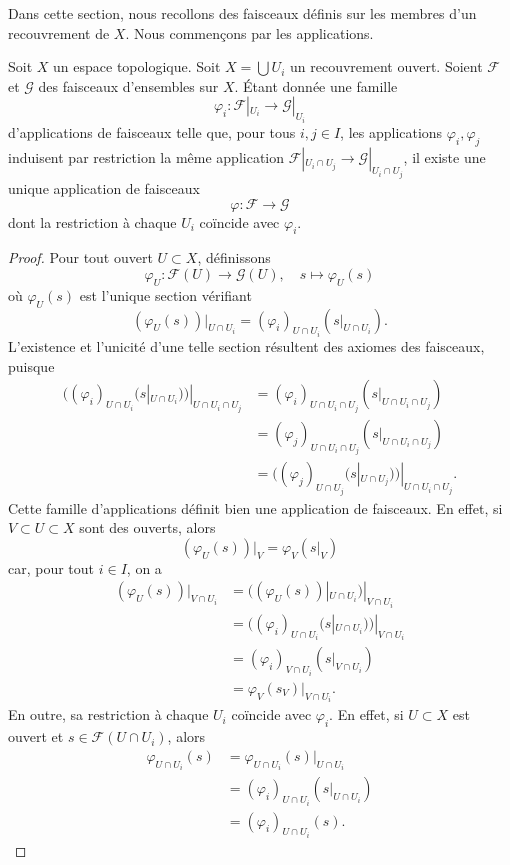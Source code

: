 \noindent
Dans cette section, nous recollons des faisceaux définis sur les membres
d'un recouvrement de $X$. Nous commençons par les applications.

\begin{lemma}
\label{lemma-glue-maps}
Soit $X$ un espace topologique.
Soit $X = \bigcup U_i$ un recouvrement ouvert.
Soient $\mathcal{F}$ et $\mathcal{G}$ des faisceaux d'ensembles sur $X$.
Étant donnée une famille
$$
\varphi_i :
\mathcal{F}|_{U_i}
\longrightarrow
\mathcal{G}|_{U_i}
$$
d'applications de faisceaux telle que, pour tous $i, j \in I$, les
applications $\varphi_i, \varphi_j$ induisent par restriction la même application
$\mathcal{F}|_{U_i \cap U_j} \to \mathcal{G}|_{U_i \cap U_j}$,
il existe une unique application de faisceaux
$$
\varphi :
\mathcal{F}
\longrightarrow
\mathcal{G}
$$
dont la restriction à chaque $U_i$ coïncide avec $\varphi_i$.
\end{lemma}

\begin{proof}
Pour tout ouvert $U \subset X$, définissons
$$
\varphi_U : \mathcal{F}(U) \to \mathcal{G}(U), \quad
s \mapsto \varphi_U(s)
$$
où $\varphi_U(s)$ est l'unique section vérifiant
$$
(\varphi_U(s))|_{U \cap U_i}
= (\varphi_i)_{U \cap U_i}(s|_{U \cap U_i}).
$$
L'existence et l'unicité d'une telle section résultent des axiomes
des faisceaux, puisque
\begin{align*}
((\varphi_i)_{U \cap U_i}(s|_{U \cap U_i}))|_{U \cap U_i \cap U_j}
&= (\varphi_i)_{U \cap U_i \cap U_j}(s|_{U \cap U_i \cap U_j})\\
&= (\varphi_j)_{U \cap U_i \cap U_j}(s|_{U \cap U_i \cap U_j})\\
&= ((\varphi_j)_{U \cap U_j}(s|_{U \cap U_j}))|_{U \cap U_i \cap U_j}.
\end{align*}
Cette famille d'applications définit bien une application de faisceaux.
En effet, si $V \subset U \subset X$ sont des ouverts, alors
$$
(\varphi_U(s))|_V
= \varphi_V(s|_V)
$$
car, pour tout $i \in I$, on a
\begin{align*}
(\varphi_U(s))|_{V \cap U_i}
&= ((\varphi_U(s))|_{U \cap U_i})|_{V \cap U_i}\\
&= ((\varphi_i)_{U \cap U_i}(s|_{U \cap U_i}))|_{V \cap U_i}\\
&= (\varphi_i)_{V \cap U_i}(s|_{V \cap U_i})\\
&= \varphi_V(s_{V})|_{V \cap U_i}.
\end{align*}
En outre, sa restriction à chaque $U_i$ coïncide avec $\varphi_i$.
En effet, si $U \subset X$ est ouvert et
$s \in \mathcal{F}(U \cap U_i)$, alors
\begin{align*}
\varphi_{U \cap U_i}(s)
&= \varphi_{U \cap U_i}(s)|_{U \cap U_i}\\
&= (\varphi_i)_{U \cap U_i}(s|_{U \cap U_i})\\
&= (\varphi_i)_{U \cap U_i}(s).
\end{align*}
\end{proof}

